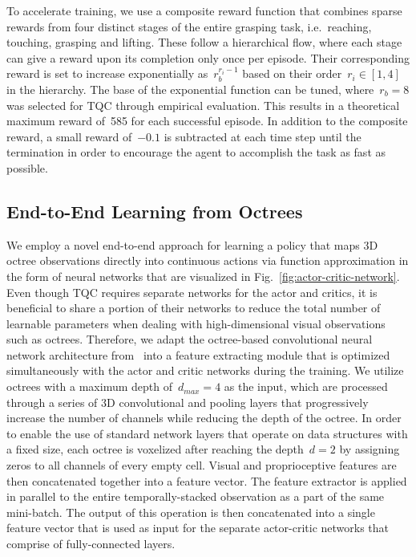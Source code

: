 To accelerate training, we use a composite reward function that combines sparse rewards from four distinct stages of the entire grasping task, i.e.~reaching, touching, grasping and lifting. These follow a hierarchical flow, where each stage can give a reward upon its completion only once per episode. Their corresponding reward is set to increase exponentially as~\mbox{\(r_{b}^{r_{i}-1}\)} based on their order~\mbox{\(r_{i}\!\in\![1,4]\)} in the hierarchy. The base of the exponential function can be tuned, where~\mbox{\(r_{b}\!=\!8\)} was selected for TQC through empirical evaluation. This results in a theoretical maximum reward of~585 for each successful episode. In addition to the composite reward, a small reward of~\(-0.1\) is subtracted at each time step until the termination in order to encourage the agent to accomplish the task as fast as possible.

\subsection{End-to-End Learning from Octrees}\label{ssec:end-to-end-learning-from-octrees}

We employ a novel end-to-end approach for learning a policy that maps 3D octree observations directly into continuous actions via function approximation in the form of neural networks that are visualized in Fig.~\ref{fig:actor-critic-network}. Even though TQC requires separate networks for the actor and critics, it is beneficial to share a portion of their networks to reduce the total number of learnable parameters when dealing with high-dimensional visual observations such as octrees. Therefore, we adapt the octree-based convolutional neural network architecture from~\cite{wang_o-cnn_2017} into a feature extracting module that is optimized simultaneously with the actor and critic networks during the training. We utilize octrees with a maximum depth of~\mbox{\(d_{max}=4\)} as the input, which are processed through a series of 3D convolutional and pooling layers that progressively increase the number of channels while reducing the depth of the octree. In order to enable the use of standard network layers that operate on data structures with a fixed size, each octree is voxelized after reaching the depth~\mbox{\(d=2\)} by assigning zeros to all channels of every empty cell. Visual and proprioceptive features are then concatenated together into a feature vector. The feature extractor is applied in parallel to the entire temporally-stacked observation as a part of the same mini-batch. The output of this operation is then concatenated into a single feature vector that is used as input for the separate actor-critic networks that comprise of fully-connected layers.

